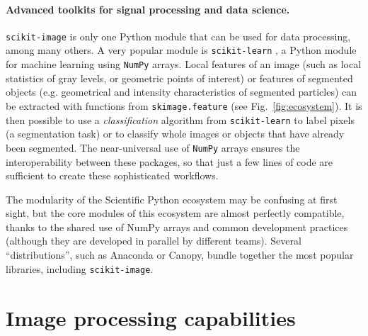 \documentclass[twocolumn]{bmcart}%
\begin{document}
\paragraph{Advanced toolkits for signal processing and data science.}

\texttt{scikit-image} is only one Python module that can be used for data
processing, among many others. A very popular module is
\texttt{scikit-learn} \citep{Pedregosa2011}, a Python module for machine
learning using \texttt{NumPy} arrays. Local features of an image
(such as local statistics of gray levels, or geometric points of
interest) or features of segmented objects (e.g. geometrical and
intensity characteristics of segmented particles) can be extracted with
functions from \texttt{skimage.feature} (see Fig.~\ref{fig:ecosystem}). It
is then possible to use a \emph{classification} algorithm from
\texttt{scikit-learn} to label pixels (a segmentation task)
or to classify whole images or objects that have already been segmented.
The near-universal use of \texttt{NumPy} arrays ensures the interoperability
between these packages, so that just a few lines of code are sufficient
to create these sophisticated workflows.

The modularity of the Scientific Python ecosystem may be
confusing at first sight, but the core modules of this ecosystem
are almost perfectly compatible, thanks to the shared use of NumPy arrays
and common development practices (although they are developed in parallel
by different teams). Several ``distributions'', such as Anaconda
or Canopy, bundle together the most popular libraries, including
\texttt{scikit-image}.

\section*{Image processing capabilities}
\end{document}
